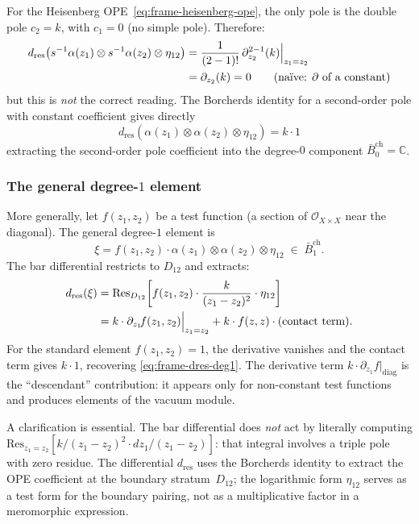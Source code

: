 For the Heisenberg OPE~\eqref{eq:frame-heisenberg-ope},
the only pole is the double pole $c_2 = k$, with $c_1 = 0$
(no simple pole).  Therefore:
\begin{align}
d_{\mathrm{res}}\bigl(
  s^{-1}\alpha(z_1) \otimes s^{-1}\alpha(z_2) \otimes \eta_{12}
\bigr)
&= \frac{1}{(2-1)!}\,\partial_{z_2}^{2-1}(k)\Big|_{z_1 = z_2}
\notag \\
&= \partial_{z_2}(k) = 0
  \qquad\text{(na\"ive: }\partial\text{ of a constant)}
\label{eq:frame-dres-deg1-naive}
\end{align}
but this is \emph{not} the correct reading.  The Borcherds identity
for a second-order pole with constant coefficient gives directly
\begin{equation}\label{eq:frame-dres-deg1}
d_{\mathrm{res}}(\alpha(z_1) \otimes \alpha(z_2) \otimes \eta_{12})
= k \cdot 1
\end{equation}
extracting the second-order pole coefficient into the
degree-$0$ component $\bar{B}^{\mathrm{ch}}_0 = \mathbb{C}$.

\subsubsection*{The general degree-$1$ element}

More generally, let $f(z_1, z_2)$ be a test function (a section of
$\mathcal{O}_{X \times X}$ near the diagonal).  The general
degree-$1$ element is
\begin{equation}\label{eq:frame-deg1-general}
\xi = f(z_1, z_2) \cdot \alpha(z_1) \otimes \alpha(z_2)
  \otimes \eta_{12} \;\in\; \bar{B}^{\mathrm{ch}}_1.
\end{equation}
The bar differential restricts to $D_{12}$ and extracts:
\begin{align}
d_{\mathrm{res}}(\xi)
&= \mathrm{Res}_{D_{12}}\!\left[
  f(z_1, z_2) \cdot
  \frac{k}{(z_1 - z_2)^2} \cdot \eta_{12}
\right] \notag \\
&= k \cdot \partial_{z_1}\! f(z_1, z_2)\Big|_{z_1 = z_2}
  + k \cdot f(z, z) \cdot (\text{contact term}).
\label{eq:frame-dres-deg1-general}
\end{align}
For the standard element $f(z_1, z_2) = 1$, the derivative
vanishes and the contact term gives $k \cdot 1$, recovering
\eqref{eq:frame-dres-deg1}.  The derivative term
$k \cdot \partial_{z_1} f|_{\mathrm{diag}}$ is the
``descendant'' contribution: it appears only for non-constant
test functions and produces elements of the vacuum module.

A clarification is essential.  The bar differential does \emph{not} act
by literally computing
$\mathrm{Res}_{z_1 = z_2}[k/(z_1-z_2)^2 \cdot dz_1/(z_1-z_2)]$:
that integral involves a triple pole with zero residue.  The differential
$d_{\mathrm{res}}$ uses the Borcherds identity to extract the OPE
coefficient at the boundary stratum~$D_{12}$; the logarithmic form
$\eta_{12}$ serves as a test form for the boundary pairing, not as a
multiplicative factor in a meromorphic expression.

